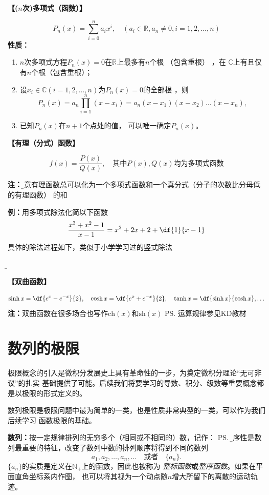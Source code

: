 {\bf 【($n$次)多项式（函数）】}
\begin{thx}
$$P_n(x)=\sum_{i=0}^na_ix^i,
  \quad (a_i\in\mathbb{R},a_n\ne 0,i=1,2,\ldots,n)$$
  {\bf 性质：}
  \begin{enumerate}[(1)]
    \setlength{\itemindent}{1cm}
    \item { $n$次多项式方程$P_n(x)=0$在$\mathbb{R}$上最多有$n$个根 （包含重根） ，在
    $\mathbb{C}$上有且仅有$n$个根（包含重根）}；
    \item 设$x_i\in\mathbb{C}(i=1,2,\ldots,n)$为$P_n(x)=0$的全部根 ，则
    $$P_n(x)=a_n\prod_{i=1}^n(x-x_i)=a_n(x-x_1)(x-x_2)\ldots(x-x_n),$$
    \item 已知$P_n(x)$在$n+1$个点处的值， 可以唯一确定$P_n(x)$。
  \end{enumerate}
\end{thx}

{\bf 【有理（分式）函数】}
\begin{thx}
$$f(x)=\frac{P(x)}{Q(x)}, \quad\mbox{其中}P(x),Q(x)\mbox{均为多项式函数}$$
\end{thx}
{\bf 注：}{\b 任意有理函数总可以化为一个多项式函数和一个真分式（分子的次数比分母低的有理函数）
的和}
	  
{{\bf 例：}用多项式除法化简以下函数}
$$\frac{x^3+x^2-1}{x-1}=x^2+2x+2+\df{1}{x-1}$$
具体的除法过程如下，类似于小学学习过的竖式除法
\begin{center}
	{\b {}}
\end{center}

{\bf 【双曲函数】}

{\small $$\sinh x =\df{e^x-e^{-x}}{2}, \quad
\cosh x =\df{e^x+e^{-x}}{2}, \quad\tanh x=\df{\sinh
x}{\cosh x}, \ldots$$}
{\bf 注：}双曲函数在很多场合也写作$\mathrm{ch}(x)$和$\mathrm{sh}(x)$
\ps{运算规律参见KD教材}

\section{数列的极限}

极限概念的引入是微积分发展史上具有革命性的一步，为奠定微积分理论“无可非议”的扎实
基础提供了可能。后续我们将要学习的导数、积分、级数等重要概念都是以极限的形式定义的。

数列极限是极限问题中最为简单的一类，也是性质非常典型的一类，可以作为我们后续学习
函数极限的基础。

{\bf 数列：}按一定规律排列的无穷多个（相同或不相同的）数，记作：
\ps{\b 有序性是数列最重要的特征，改变了数列中数的排列顺序将得到不同的数列}
$$a_1,a_2,\ldots,a_n,\ldots\quad\mbox{或者}\quad\{a_n\}.$$
$\{a_n\}$的实质是定义在$\mathbb{N}_+$上的函数，因此也被称为
{\it 整标函数}或{\it 整序函数}。如果在平面直角坐标系内作图，
也可以将其视为一个动点随$n$增大所留下的离散的运动轨迹。

